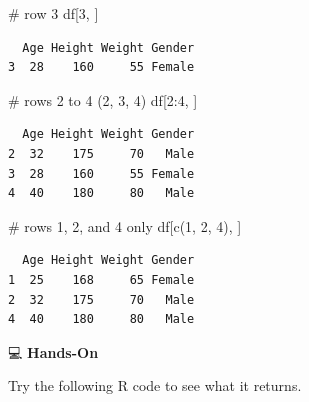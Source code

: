 \documentclass[
  letterpaper,
  DIV=11,
  numbers=noendperiod]{scrreprt}
\newenvironment{Shaded}{\begin{snugshade}}{\end{snugshade}}
\newcommand{\CommentTok}[1]{\textcolor[rgb]{0.37,0.37,0.37}{#1}}
\newcommand{\DecValTok}[1]{\textcolor[rgb]{0.68,0.00,0.00}{#1}}
\newcommand{\FunctionTok}[1]{\textcolor[rgb]{0.28,0.35,0.67}{#1}}
\newcommand{\NormalTok}[1]{\textcolor[rgb]{0.00,0.23,0.31}{#1}}
\newcommand{\SpecialCharTok}[1]{\textcolor[rgb]{0.37,0.37,0.37}{#1}}
\begin{document}
\begin{tcolorbox}[enhanced jigsaw, colbacktitle=quarto-callout-tip-color!10!white, opacitybacktitle=0.6, breakable, left=2mm, leftrule=.75mm, toprule=.15mm, toptitle=1mm, bottomtitle=1mm, colframe=quarto-callout-tip-color-frame, opacityback=0, coltitle=black, arc=.35mm, titlerule=0mm, colback=white, bottomrule=.15mm, title=\textcolor{quarto-callout-tip-color}{\faLightbulb}\hspace{0.5em}{Answer}, rightrule=.15mm]

\begin{Shaded}
\begin{Highlighting}[]
\CommentTok{\# row 3}
\NormalTok{df[}\DecValTok{3}\NormalTok{, ]}
\end{Highlighting}
\end{Shaded}

\begin{verbatim}
  Age Height Weight Gender
3  28    160     55 Female
\end{verbatim}

\begin{Shaded}
\begin{Highlighting}[]
\CommentTok{\# rows 2 to 4 (2, 3, 4)}
\NormalTok{df[}\DecValTok{2}\SpecialCharTok{:}\DecValTok{4}\NormalTok{, ]}
\end{Highlighting}
\end{Shaded}

\begin{verbatim}
  Age Height Weight Gender
2  32    175     70   Male
3  28    160     55 Female
4  40    180     80   Male
\end{verbatim}

\begin{Shaded}
\begin{Highlighting}[]
\CommentTok{\# rows 1, 2, and 4 only}
\NormalTok{df[}\FunctionTok{c}\NormalTok{(}\DecValTok{1}\NormalTok{, }\DecValTok{2}\NormalTok{, }\DecValTok{4}\NormalTok{), ]}
\end{Highlighting}
\end{Shaded}

\begin{verbatim}
  Age Height Weight Gender
1  25    168     65 Female
2  32    175     70   Male
4  40    180     80   Male
\end{verbatim}

\end{tcolorbox}

💻 \textbf{Hands-On}

Try the following R code to see what it returns.
\end{document}

